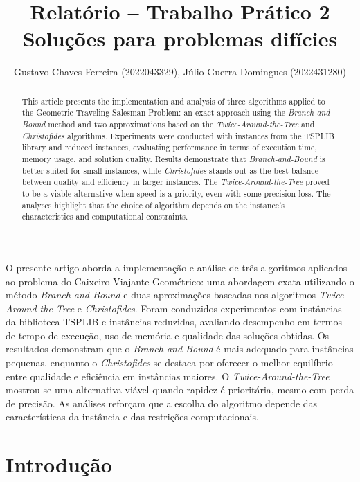 \documentclass[12pt]{article}
\title{Relatório -- Trabalho Prático 2\\
\large{Soluções para problemas difícies}
}
\author{Gustavo Chaves Ferreira\inst{1} (2022043329), Júlio Guerra Domingues\inst{1} (2022431280)}
\begin{document}
 

\maketitle

\begin{abstract}
This article presents the implementation and analysis of three algorithms applied to the Geometric Traveling Salesman Problem: an exact approach using the \textit{Branch-and-Bound} method and two approximations based on the \textit{Twice-Around-the-Tree} and \textit{Christofides} algorithms. Experiments were conducted with instances from the TSPLIB library and reduced instances, evaluating performance in terms of execution time, memory usage, and solution quality. Results demonstrate that \textit{Branch-and-Bound} is better suited for small instances, while \textit{Christofides} stands out as the best balance between quality and efficiency in larger instances. The \textit{Twice-Around-the-Tree} proved to be a viable alternative when speed is a priority, even with some precision loss. The analyses highlight that the choice of algorithm depends on the instance's characteristics and computational constraints.
\end{abstract}

\begin{resumo}
O presente artigo aborda a implementação e análise de três algoritmos aplicados ao problema do Caixeiro Viajante Geométrico: uma abordagem exata utilizando o método \textit{Branch-and-Bound} e duas aproximações baseadas nos algoritmos \textit{Twice-Around-the-Tree} e \textit{Christofides}. Foram conduzidos experimentos com instâncias da biblioteca TSPLIB e instâncias reduzidas, avaliando desempenho em termos de tempo de execução, uso de memória e qualidade das soluções obtidas. Os resultados demonstram que o \textit{Branch-and-Bound} é mais adequado para instâncias pequenas, enquanto o \textit{Christofides} se destaca por oferecer o melhor equilíbrio entre qualidade e eficiência em instâncias maiores. O \textit{Twice-Around-the-Tree} mostrou-se uma alternativa viável quando rapidez é prioritária, mesmo com perda de precisão. As análises reforçam que a escolha do algoritmo depende das características da instância e das restrições computacionais.
  
\end{resumo}

\section{Introdução}
\end{document}
